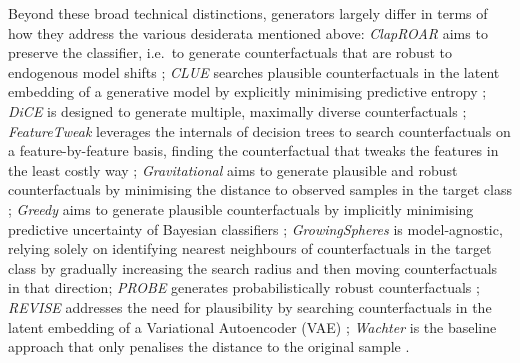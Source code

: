 \documentclass{juliacon}
\begin{document}
Beyond these broad technical distinctions, generators largely differ in
terms of how they address the various desiderata mentioned above:
\emph{ClapROAR} aims to preserve the classifier, i.e.~to generate
counterfactuals that are robust to endogenous model shifts
\autocite{altmeyer2023endogenous}; \emph{CLUE} searches plausible
counterfactuals in the latent embedding of a generative model by
explicitly minimising predictive entropy \autocite{antoran2020getting};
\emph{DiCE} is designed to generate multiple, maximally diverse
counterfactuals \autocite{mothilal2020explaining}; \emph{FeatureTweak}
leverages the internals of decision trees to search counterfactuals on a
feature-by-feature basis, finding the counterfactual that tweaks the
features in the least costly way \autocite{tolomei2017interpretable};
\emph{Gravitational} aims to generate plausible and robust
counterfactuals by minimising the distance to observed samples in the
target class \autocite{altmeyer2023endogenous}; \emph{Greedy} aims to
generate plausible counterfactuals by implicitly minimising predictive
uncertainty of Bayesian classifiers \autocite{schut2021generating};
\emph{GrowingSpheres} is model-agnostic, relying solely on identifying
nearest neighbours of counterfactuals in the target class by gradually
increasing the search radius and then moving counterfactuals in that
direction\autocite{laugel2017inversea}; \emph{PROBE} generates
probabilistically robust counterfactuals
\autocite{pawelczyk2022probabilistically}; \emph{REVISE} addresses the
need for plausibility by searching counterfactuals in the latent
embedding of a Variational Autoencoder (VAE)
\autocite{joshi2019realistic}; \emph{Wachter} is the baseline approach
that only penalises the distance to the original sample
\autocite{wachter2017counterfactual}.
\end{document}
